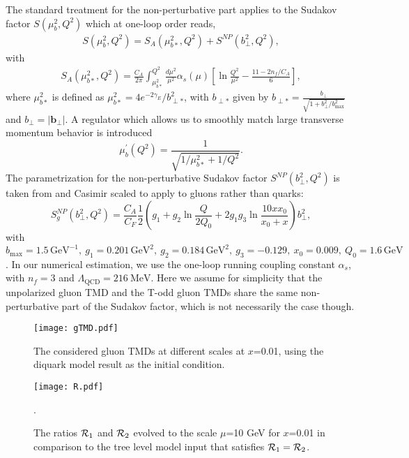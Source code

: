 \documentclass[prd,aps,preprintnumbers,fleqn,showpacs,nofootinbib,superscriptaddress]{revtex4}
\begin{document}
The standard treatment for the non-perturbative part applies to the Sudakov factor $S(\mu_b^2,Q^2)$ which at one-loop order reads,
\begin{eqnarray}
S(\mu_b^2,Q^2)=  S_A(\mu_{b*}^2,Q^2) +S^{NP}(b_\perp^2, Q^2),
\end{eqnarray}
with 
\begin{eqnarray}
 S_A(\mu_{b*}^2,Q^2) =
\frac{C_A}{2\pi} \int^{Q^2}_{\mu_{b*}^2} \frac{d\mu^2}{\mu^2} \alpha_s(\mu) \left[ \ln
\frac{Q^2}{\mu^2} - \frac{11-2n_f/C_A}{6} \right ],
\end{eqnarray}
where $\mu_{b*}^2$ is defined as $\mu_{b*}^2=4e^{-2\gamma_E}/b_{\perp*}^2$, with $b_{\perp*}$ given by
$b_{\perp *}=\frac{b_{\perp}}{\sqrt{1+b_{\perp}^2/b^2_{\max}}} $ and $b_\perp = |\bm{b}_\perp|$. A regulator which allows us to smoothly match  large transverse momentum behavior is introduced~\cite{Boer:2014tka,Boer:2015uqa,Collins:2016hqq}
\begin{equation}
\mu_b^\prime(Q^2)= \frac{1}{\sqrt{1/\mu_{b*}^2  +1/Q^2 }}.
\end{equation}
The parametrization for the non-perturbative Sudakov factor $S^{NP}(b_\perp^2,Q^2)$ is taken from \cite{Aybat:2011zv} and Casimir scaled to apply to gluons rather than quarks: 
\begin{equation}
S_{g}^{NP}(b_{\perp}^2,Q^2)=\frac{C_A}{C_F}
\frac{1}{2}\left( g_1+g_2 \ln \frac{Q}{2 Q_0} + 2 g_1 g_3 \ln \frac{10 x x_0}{x_0+x} \right)
b_{\perp}^2,
\end{equation}
with $b_{\max}=1.5\, \text{GeV}^{-1},~ g_1=0.201\, \text{GeV}^2, ~ g_2=0.184\, \text{GeV}^2,~g_3=-0.129,~x_0=0.009,~Q_0=1.6\, \text{GeV}$. In our numerical estimation,  we use the one-loop running coupling constant $\alpha_s$, with $n_f=3$ and $\Lambda_{\text{QCD}} = 216~ \text{MeV}$. Here we assume for simplicity that the unpolarized gluon TMD and the T-odd gluon TMDs share the same non-perturbative part of the Sudakov factor, which is not necessarily the case though.
\begin{figure}[htpb]
\texttt{[image: gTMD.pdf]}
\caption{The considered gluon TMDs at different scales at $x$=0.01, using the diquark model result as the initial condition.} \label{figs:gluonTMDs_1}
\end{figure}
%
\begin{figure}[htpb]
\texttt{[image: R.pdf]}
\caption{The ratios ${\cal R}_1$ and ${\cal R}_2$ evolved to the scale $\mu$=10 GeV for $x$=0.01 in comparison to the tree level model input that satisfies ${\cal R}_1={\cal R}_2$.}.
 \label{figs:gluonTMDs_ratio}
\end{figure}
\end{document}
